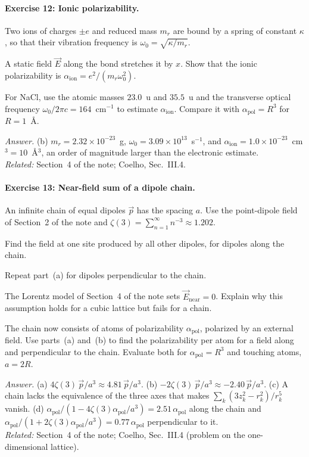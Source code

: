 \documentclass[11pt]{article}      %
\numberwithin{equation}{section}   %
\begin{document}
\paragraph{Exercise 12: Ionic polarizability.}
Two ions of charges $\pm e$ and reduced mass $m_r$ are bound by a spring of constant $\kappa$, so that their vibration frequency is $\omega_0 = \sqrt{\kappa/m_r}$.
\begin{parts}
    \item A static field $\vec E$ along the bond stretches it by $x$. Show that the ionic polarizability is $\alpha_{\text{ion}} = e^2/(m_r\omega_0^2)$.
    \item For NaCl, use the atomic masses $23.0$~u and $35.5$~u and the transverse optical frequency $\omega_0/2\pi c = 164$~cm$^{-1}$ to estimate $\alpha_{\text{ion}}$. Compare it with $\alpha_{\text{pol}} = R^3$ for $R = 1$~\AA.
\end{parts}
\textit{Answer.} (b) $m_r = 2.32\times10^{-23}$~g, $\omega_0 = 3.09\times10^{13}$~s$^{-1}$, and $\alpha_{\text{ion}} = 1.0\times10^{-23}$~cm$^3 = 10$~\AA$^3$, an order of magnitude larger than the electronic estimate.\\
\textit{Related:} Section~4 of the note; Coelho, Sec.~III.4.

\paragraph{Exercise 13: Near-field sum of a dipole chain.}
An infinite chain of equal dipoles $\vec p$ has the spacing $a$. Use the point-dipole field of Section~2 of the note and $\zeta(3) = \sum_{n=1}^{\infty} n^{-3} \approx 1.202$.
\begin{parts}
    \item Find the field at one site produced by all other dipoles, for dipoles along the chain.
    \item Repeat part~(a) for dipoles perpendicular to the chain.
    \item The Lorentz model of Section~4 of the note sets $\vec E_{\text{near}} = 0$. Explain why this assumption holds for a cubic lattice but fails for a chain.
    \item The chain now consists of atoms of polarizability $\alpha_{\text{pol}}$, polarized by an external field. Use parts~(a) and~(b) to find the polarizability per atom for a field along and perpendicular to the chain. Evaluate both for $\alpha_{\text{pol}} = R^3$ and touching atoms, $a = 2R$.
\end{parts}
\textit{Answer.} (a) $4\zeta(3)\,\vec p/a^3 \approx 4.81\,\vec p/a^3$. (b) $-2\zeta(3)\,\vec p/a^3 \approx -2.40\,\vec p/a^3$. (c) A chain lacks the equivalence of the three axes that makes $\sum_k(3z_k^2 - r_k^2)/r_k^5$ vanish. (d) $\alpha_{\text{pol}}/(1 - 4\zeta(3)\alpha_{\text{pol}}/a^3) = 2.51\,\alpha_{\text{pol}}$ along the chain and $\alpha_{\text{pol}}/(1 + 2\zeta(3)\alpha_{\text{pol}}/a^3) = 0.77\,\alpha_{\text{pol}}$ perpendicular to it.\\
\textit{Related:} Section~4 of the note; Coelho, Sec.~III.4 (problem on the one-dimensional lattice).
\end{document}
